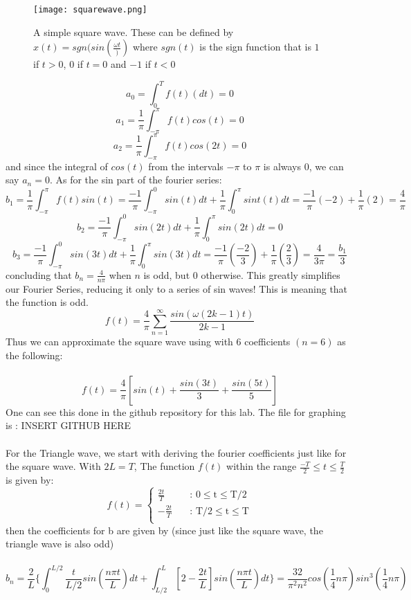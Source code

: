 \documentclass{article}
\begin{document}
\begin{figure}[h]

  \centering
  \texttt{[image: squarewave.png]}
  \caption{A simple square wave. These can be defined by $x(t) = sgn(sin(\frac{\omega t}))$ where $sgn(t)$ is the sign function that is $1$ if $ t > 0$, $0$ if $ t = 0$ and $-1$ if $ t < 0$}
  \label{swave}

\end{figure}

$$a_0 = \int_0^T f(t)(dt) = 0$$
$$a_1 = \frac{1}{\pi} \int_{-\pi}^{\pi} f(t)cos(t) = 0$$
$$a_2 = \frac{1}{\pi} \int_{-\pi}^{\pi} f(t)cos(2t) = 0 $$
and since the integral of $cos(t)$ from the intervals $-\pi$ to $\pi$ is always 0, we can say $a_n = 0$. As for the sin part of the fourier series: \\
$$b_1 = \frac{1}{\pi} \int_{-\pi}^{\pi}f(t)sin(t) = \frac{-1}{\pi}\int_{-\pi}^{0} sin(t)dt + \frac{1}{\pi}\int_0^{\pi} sint(t)dt= \frac{-1}{\pi}(-2) + \frac{1}{\pi} (2) = \frac{4}{\pi}$$
$$b_2 = \frac{-1}{\pi} \int_{-\pi}^{0}sin(2t)dt + \frac{1}{\pi}\int_{0}^{\pi}sin(2t)dt = 0 $$
$$b_3 = \frac{-1}{\pi}\int_{-\pi}^{0}sin(3t)dt + \frac{1}{\pi}\int_{0}^{\pi}sin(3t)dt = \frac{-1}{\pi}(\frac{-2}{3}) + \frac{1}{\pi}(\frac{2}{3})= \frac{4}{3\pi} = \frac{b_1}{3}$$
concluding that $b_n = \frac{4}{n\pi}$ when $n$ is odd, but $0$ otherwise. This greatly simplifies our Fourier Series, reducing it only to a series of sin waves! This is meaning that the function is odd.
\begin{equation}
f(t) = \frac{4}{\pi}\sum_{n=1}^{\infty} \frac{sin(\omega(2k-1)t)}{2k-1}
\label{squarefunction}
\end{equation}
Thus we can approximate the square wave using with 6 coefficients $(n = 6)$ as the following: \\ \\ $$f(t) = \frac{4}{\pi}[sin(t) + \frac{sin(3t)}{3} + \frac{sin(5t)}{5}] $$
One can see this done in the github repository for this lab. The file for graphing is : INSERT GITHUB HERE  \\ \\

For the Triangle wave, we start with deriving the fourier coefficients just like for the square wave. With $2L = T$,  The function $f(t)$ within the range $\frac{-T}{2} \leq t \leq \frac{T}{2}$ is given by: \\
\[
f(t) =
  \begin{cases}
    \text{$\frac{2t}{T}$} &\quad\text{: 0}\le\text{t}\le\text{T/2}\\
    \text{$-\frac{2t}{T}$} &\quad\text{: T/2}\le\text{t}\le\text{T} \\
  \end{cases}
\]
then the coefficients for b are given by (since just like the square wave, the triangle wave is also odd) \\ \\
\begin{equation}
b_n = \frac{2}{L} \{\int_0^{L/2}\frac{t}{L/2}sin(\frac{n\pi t}{L})dt + \int_{L/2}^{L}[2-\frac{2t}{L}]sin(\frac{n\pi t}{L})dt \} = \frac{32}{\pi^2 n^2} cos( \frac{1}{4} n \pi ) sin^3(\frac{1}{4}n\pi)
\label{triwavecoef}
\end{equation}
\end{document}
